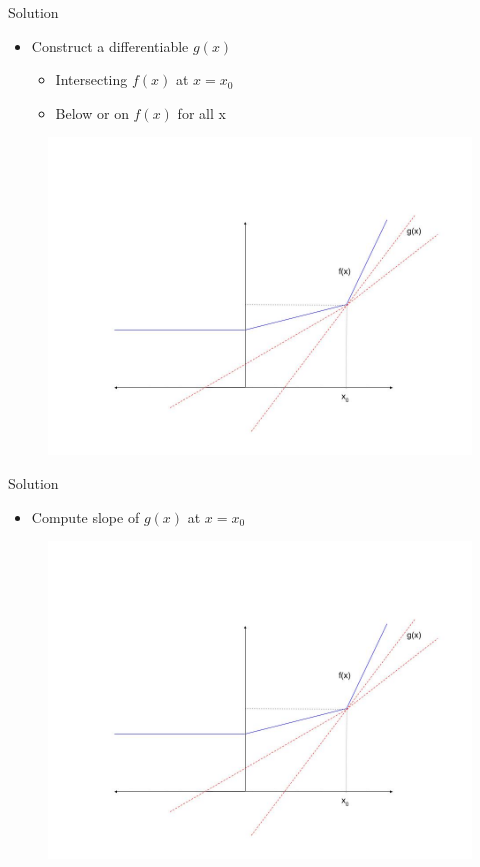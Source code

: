 \documentclass{beamer}
\begin{document}
\begin{frame}{Solution}

\begin{itemize}
\item Construct a differentiable $g(x)$ 
\begin{itemize}
\item Intersecting $f(x)$ at $x = x_0$
\item Below or on $f(x)$ for all x
\end{itemize}
\end{itemize}
\begin{figure}
\centering
\includegraphics[scale = 0.25]{../assets/lasso/diagrams/subgradient_2.jpg}
\label{fig:my_label}
\end{figure}
\end{frame}

\begin{frame}{Solution}

\begin{itemize}
\item Compute slope of $g(x)$ at $x = x_0$
\end{itemize}
\begin{figure}
\centering
\includegraphics[scale = 0.25]{../assets/lasso/diagrams/subgradient_2.jpg}

\label{fig:my_label}
\end{figure}
\end{frame}
\end{document}
